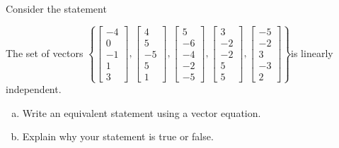 
\begin{exerciseStatement}


Consider the statement 
\begin{center}\begin{minipage}{0.8\textwidth}
 The set of vectors \( \left\{ \left[\begin{array}{c}
-4 \\
0 \\
-1 \\
1 \\
3
\end{array}\right] , \left[\begin{array}{c}
4 \\
5 \\
-5 \\
5 \\
1
\end{array}\right] , \left[\begin{array}{c}
5 \\
-6 \\
-4 \\
-2 \\
-5
\end{array}\right] , \left[\begin{array}{c}
3 \\
-2 \\
-2 \\
5 \\
5
\end{array}\right] , \left[\begin{array}{c}
-5 \\
-2 \\
3 \\
-3 \\
2
\end{array}\right] \right\} \)is linearly independent.
\end{minipage}\end{center}
    


\begin{enumerate}[(a)]
\item  Write an equivalent statement using a vector equation.
\item  Explain why your statement is true or false.
\end{enumerate}
    
\end{exerciseStatement}
    

